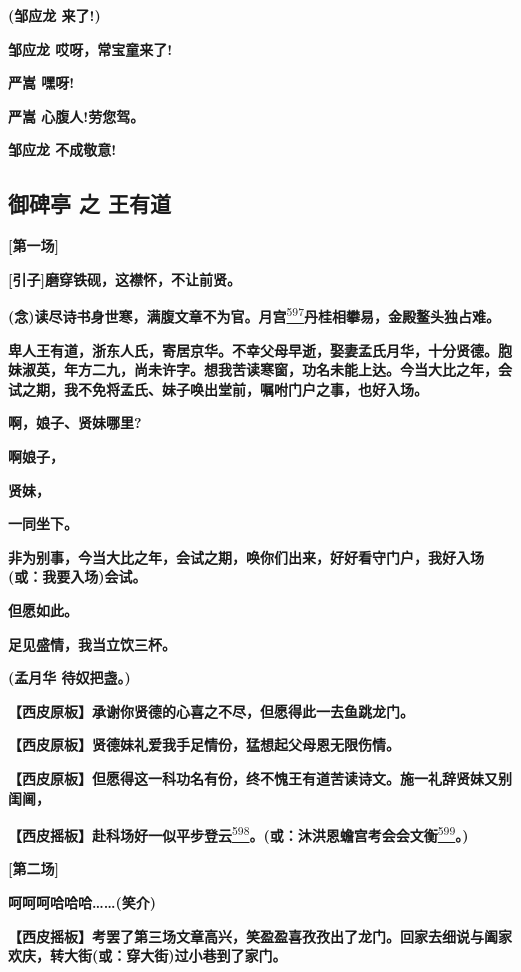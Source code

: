 \textbf{(邹应龙 来了!)}

\textbf{邹应龙 哎呀，常宝童来了!}

\textbf{严嵩 嘿呀!}

\textbf{严嵩 心腹人!劳您驾。}

\textbf{邹应龙 不成敬意!}

\hypertarget{ux5fa1ux7891ux4ead-ux4e4b-ux738bux6709ux9053}{%
\subsection{御碑亭 之
王有道}\label{ux5fa1ux7891ux4ead-ux4e4b-ux738bux6709ux9053}}

\textbf{{[}第一场{]}}

\textbf{{[}引子{]}磨穿铁砚，这襟怀，不让前贤。}

\textbf{(念)读尽诗书身世寒，满腹文章不为官。月宫}\protect\hyperlink{fn597}{\textsuperscript{597}}\textbf{丹桂相攀易，金殿鳌头独占难。}

\textbf{卑人王有道，浙东人氏，寄居京华。不幸父母早逝，娶妻孟氏月华，十分贤德。胞妹淑英，年方二九，尚未许字。想我苦读寒窗，功名未能上达。今当大比之年，会试之期，我不免将孟氏、妹子唤出堂前，嘱咐门户之事，也好入场。}

\textbf{啊，娘子、贤妹哪里?}

\textbf{啊娘子，}

\textbf{贤妹，}

\textbf{一同坐下。}

\textbf{非为别事，今当大比之年，会试之期，唤你们出来，好好看守门户，我好入场(或：我要入场)会试。}

\textbf{但愿如此。}

\textbf{足见盛情，我当立饮三杯。}

\textbf{(孟月华 待奴把盏。)}

\textbf{【西皮原板】承谢你贤德的心喜之不尽，但愿得此一去鱼跳龙门。}

\textbf{【西皮原板】贤德妹礼爱我手足情份，猛想起父母恩无限伤情。}

\textbf{【西皮原板】但愿得这一科功名有份，终不愧王有道苦读诗文。施一礼辞贤妹又别闺阃，}

\textbf{【西皮摇板】赴科场好一似平步登云}\protect\hyperlink{fn598}{\textsuperscript{598}}\textbf{。(或：沐洪恩蟾宫考会会文衡}\protect\hyperlink{fn599}{\textsuperscript{599}}\textbf{。)}

\textbf{{[}第二场{]}}

\textbf{呵呵呵哈哈哈\ldots{}\ldots{}(笑介)}

\textbf{【西皮摇板】考罢了第三场文章高兴，笑盈盈喜孜孜出了龙门。回家去细说与阖家欢庆，转大街(或：穿大街)过小巷到了家门。}

